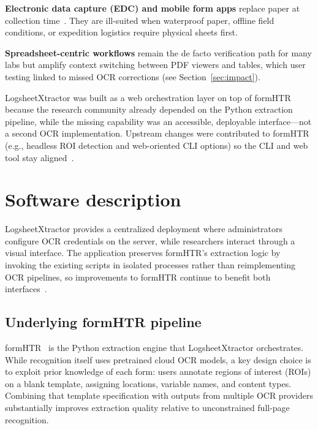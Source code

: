 \documentclass[preprint,12pt,a4paper]{elsarticle}
\begin{document}
\textbf{Electronic data capture (EDC) and mobile form apps} replace paper at collection time~\cite{VANTAMELEN2004123,BREWER2016131}.
They are ill-suited when waterproof paper, offline field conditions, or expedition logistics require physical sheets first.

\textbf{Spreadsheet-centric workflows} remain the de facto verification path for many labs but amplify context switching between PDF viewers and tables, which user testing linked to missed OCR corrections (see Section~\ref{sec:impact}).

LogsheetXtractor was built as a web orchestration layer on top of formHTR because the research community already depended on the Python extraction pipeline, while the missing capability was an accessible, deployable interface---not a second OCR implementation.
Upstream changes were contributed to formHTR (e.g., headless ROI detection and web-oriented CLI options) so the CLI and web tool stay aligned~\cite{formHTR_pr81}.

\section{Software description}
\label{sec:software-description}

LogsheetXtractor provides a centralized deployment where administrators configure OCR credentials on the server, while researchers interact through a visual interface.
The application preserves formHTR's extraction logic by invoking the existing scripts in isolated processes rather than reimplementing OCR pipelines, so improvements to formHTR continue to benefit both interfaces~\cite{formHTR_pr81}.

\subsection{Underlying formHTR pipeline}
\label{sec:formhtr}

formHTR~\cite{formHTR_repo} is the Python extraction engine that LogsheetXtractor orchestrates.
While recognition itself uses pretrained cloud OCR models, a key design choice is to exploit prior knowledge of each form: users annotate regions of interest (ROIs) on a blank template, assigning locations, variable names, and content types.
Combining that template specification with outputs from multiple OCR providers substantially improves extraction quality relative to unconstrained full-page recognition.
\end{document}
